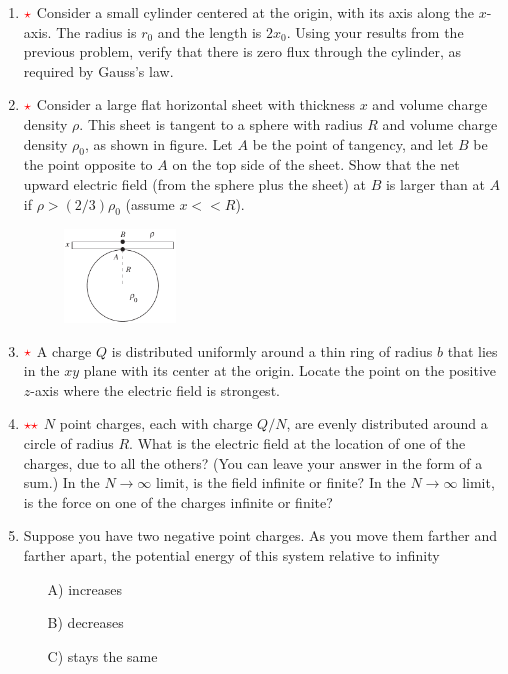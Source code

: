 \begin{enumerate}
\item $\color{red}{\star}$ Consider a small cylinder centered at the origin, with its axis
along the $x$-axis. The radius is $r_0$ and the length is $2x_0$. Using
your results from the previous problem, verify that there is zero flux through
the cylinder, as required by Gauss’s law.
    
\item $\color{red}{\star}$ Consider a large flat horizontal sheet with thickness $x$ and volume
charge density $\rho$. This sheet is tangent to a sphere with radius $R$
and volume charge density $\rho_0$, as shown in figure. Let $A$ be the
point of tangency, and let $B$ be the point opposite to $A$ on the top
side of the sheet. Show that the net upward electric field (from
the sphere plus the sheet) at $B$ is larger than at $A$ if $\rho>(2/3)\rho_0$
(assume $x<<R$).

    \begin{figure}[H]
        \centering
        \includegraphics[width=0.28\textwidth]{figures-workshop01/problem-30.png}
    \end{figure}

    \item $\color{red}{\star}$ A charge $Q$ is distributed uniformly around a thin ring of radius $b$ that lies in the $xy$ plane with its center at the origin. Locate the
point on the positive $z$-axis where the electric field is
strongest.

\item $\color{red}{\star\star}$ $N$ point charges, each with charge $Q/N$, are evenly distributed
around a circle of radius $R$. What is the electric field at the location of one of the charges, due to all the others? (You can leave
your answer in the form of a sum.) In the $N\rightarrow\infty$ limit, is the
field infinite or finite? In the $N\rightarrow\infty$ limit, is the force on one of
the charges infinite or finite?

\item Suppose you have two negative point charges. As you move them farther and farther apart, the potential energy of this system relative to infinity

\begin{multicols}{5}
    \begin{itemize}
        \item[A)] increases
        \item[B)] decreases
        \item[C)] stays the same
    \end{itemize}
\end{multicols}


\end{enumerate}
